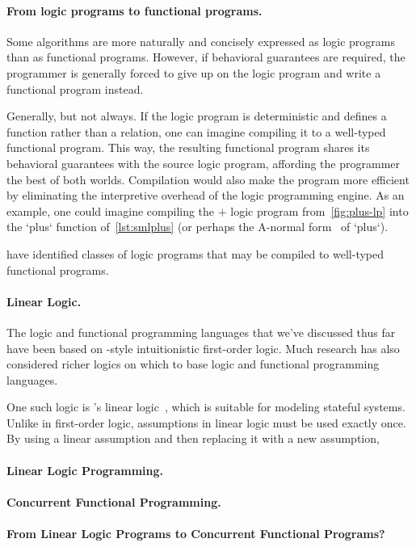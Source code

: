\paragraph{From logic programs to functional programs.}
Some algorithms are more naturally and concisely expressed as logic programs than as functional programs.
%
However, if behavioral guarantees are required, the programmer is generally forced to give up on the logic program and write a functional program instead.

Generally, but not always.
If the logic program is deterministic and defines a function rather than a relation, one can imagine compiling it to a well-typed functional program.
%
This way, the resulting functional program shares its behavioral guarantees with the source logic program, affording the programmer the best of both worlds.
Compilation would also make the program more efficient by eliminating the interpretive overhead of the logic programming engine.
As an example, one could imagine compiling the $\plus{}$ logic program from~\cref{fig:plus-lp} into the \sml`plus` function of~\cref{lst:smlplus} (or perhaps the A-normal form~\autocite{Sabry+Felleisen:LASC93} of \sml`plus`).


\textcite{Debray+Warren:TOPLAS89}
\textcites{Felleisen:IU86}{Haynes:JLP86} have identified classes of logic programs that may be compiled to well-typed functional programs.


\paragraph*{Linear Logic.}
The logic and functional programming languages that we've discussed thus far have been based on \citeauthor{Gentzen:MZ35}-style intuitionistic first-order logic.
Much research has also considered richer logics on which to base logic and functional programming languages.

One such logic is \citeauthor{Girard:TCS87}'s linear logic~\autocite*{Girard:TCS87}, which is suitable for modeling stateful systems.
Unlike in first-order logic, assumptions in linear logic must be used exactly once.
By using a linear assumption and then replacing it with a new assumption, 


\paragraph*{Linear Logic Programming.}


\paragraph*{Concurrent Functional Programming.}


\paragraph*{From Linear Logic Programs to Concurrent Functional Programs?}


\clearpage






